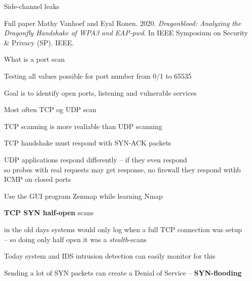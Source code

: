 \documentclass[Screen16to9,17pt]{foils}
\begin{document}
\begin{list2}
\item Side-channel leaks
\item Full paper Mathy Vanhoef and Eyal Ronen. 2020. \emph{Dragonblood: Analyzing the Dragonfly Handshake of WPA3 and EAP-pwd}. In IEEE Symposium on Security \& Privacy (SP). IEEE.

\end{list2}




\begin{list1}
\item What is a port scan
\item Testing all values possible for port number from 0/1 to 65535
\item Goal is to identify open ports, listening and vulnerable services
\item Most often TCP og UDP scan
\item TCP scanning is more realiable than UDP scanning
\item TCP handshake must respond with SYN-ACK packets
\item UDP applications respond differently -- if they even respond\\
so probes with real requests may get response, no firewall they respond withb ICMP on closed ports
\item Use the GUI program Zenmap while learning Nmap
\end{list1}



\begin{list2}
\item {\bfseries TCP SYN half-open} scans
\item in the old days systems would only log when a full TCP connection was setup\\
  -- so doing only half open it was a \emph{stealth}-scans
\item Today system and IDS intrusion detection can easily monitor for this
\item Sending a lot of SYN packets can create a Denial of Service -- {\bfseries SYN-flooding}
\end{list2}

\end{document}
